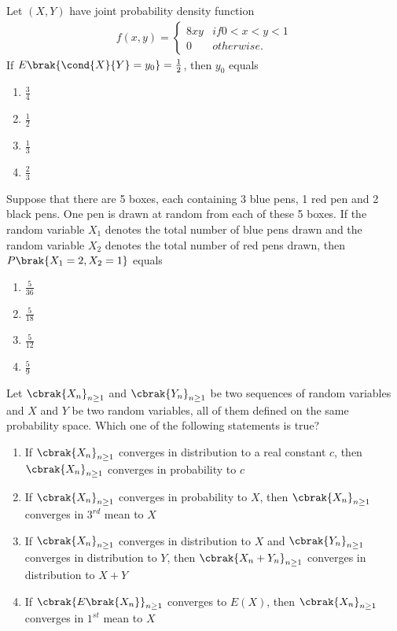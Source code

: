 \item Let $ (X,Y) $ have joint probability density function
\begin{align*}
    f(x, y) = \begin{cases} 
      8xy & if 0 < x < y < 1 \\ 
      0 & otherwise. 
   \end{cases}
\end{align*}
If $ E\brak{\cond {X} {Y} = y_0}= \frac{1}{2} $, then $ y_0 $ equals
\begin{enumerate}
    \item $ \frac{3}{4} $
    \item $ \frac{1}{2} $
    \item $ \frac{1}{3} $
    \item $ \frac{2}{3} $
\end{enumerate}

\item Suppose that there are 5 boxes, each containing 3 blue pens, 1 red pen and 2 black pens. One pen is drawn at random from each of these 5 boxes. If the random variable $ X_1$ denotes the total number of blue pens drawn and the random variable $ X_2 $ denotes the total number of red pens drawn, then $ P\brak{X_1 = 2, X_2 = 1} $ equals
\begin{enumerate}
    \item $ \frac{5}{36} $
    \item $ \frac{5}{18} $
    \item $ \frac{5}{12} $
    \item $ \frac{5}{9} $
\end{enumerate}

\item Let $ \cbrak{X_n}_{n \geq 1} $ and $ \cbrak{Y_n}_{n \geq 1} $ be two sequences of random variables and $ X $ and $ Y $ be two random variables, all of them defined on the same probability space. Which one of the following statements is true?
\begin{enumerate}
    \item If $\cbrak{X_n}_{n \geq 1}$ converges in distribution to a real constant $ c $, then $ \cbrak{X_n}_{n \geq 1} $ converges in probability to $ c $
    \item If $ \cbrak{X_n}_{n \geq 1} $ converges in probability to $ X $, then $ \cbrak{X_n}_{n \geq 1} $ converges in $3^{rd}$ mean to $ X $
    \item If $ \cbrak{X_n}_{n \geq 1} $ converges in distribution to $ X $ and $ \cbrak{Y_n}_{n \geq 1} $ converges in distribution to $ Y $, then $ \cbrak{X_n + Y_n}_{n \geq 1} $ converges in distribution to $ X + Y $
    \item If $\cbrak{E\brak{X_n}}_{n \geq 1}$ converges to $E(X) $, then $ \cbrak{X_n}_{n \geq 1}$ converges in $1^{st}$ mean to $ X $
\end{enumerate}

